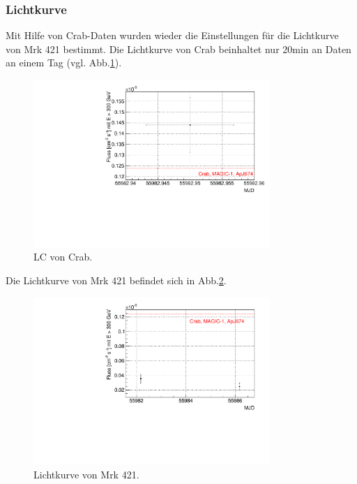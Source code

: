 \subsubsection{Lichtkurve}
Mit Hilfe von Crab-Daten wurden wieder die Einstellungen für die Lichtkurve von Mrk 421 bestimmt.
Die Lichtkurve von Crab beinhaltet nur 20min an Daten an einem Tag (vgl. Abb.\ref{Datenset1_LC_Crab}).

\begin{figure}
    \centering
    \includegraphics[width=0.8\textwidth]{./Plots/04_MrkAnalyse/Datenset1/Datenset1_LC_Crab.pdf}
    \caption{LC von Crab.}
    \label{Datenset1_LC_Crab}
\end{figure}

Die Lichtkurve von Mrk 421 befindet sich in Abb.\ref{Datenset1_LC_Mrk421}.

\begin{figure}
    \centering
    \includegraphics[width=0.8\textwidth]{./Plots/04_MrkAnalyse/Datenset1/Datenset1_LC_Mrk421.pdf}
    \caption{Lichtkurve von Mrk 421.}
    \label{Datenset1_LC_Mrk421}
\end{figure}

